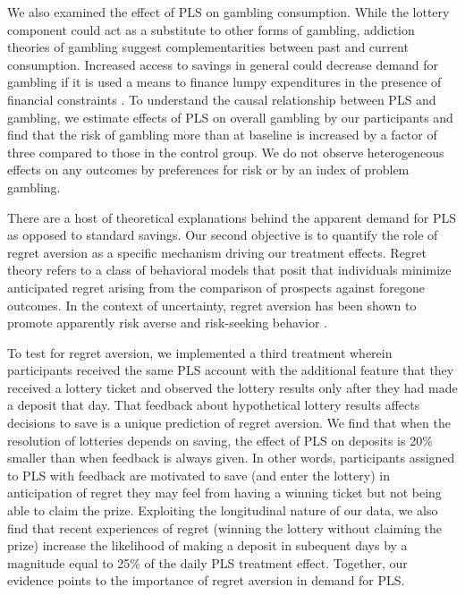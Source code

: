 \documentclass[12pt]{article}
\begin{document}
	We also examined the effect of PLS on gambling consumption. While the lottery component could act as a substitute to other forms of gambling, addiction theories of gambling \parencite{becker_theory_1988} suggest complementarities between past and current consumption. Increased access to savings in general could decrease demand for gambling if it is used a means to finance lumpy expenditures in the presence of financial constraints \parencite{herskowitz_gambling_2016}. To understand the causal relationship between PLS and gambling, we estimate effects of PLS on overall gambling by our participants and find that the risk of gambling more than at baseline is increased by a factor of three compared to those in the control group. We do not observe heterogeneous effects on any outcomes by preferences for risk or by an index of problem gambling.

	There are a host of theoretical explanations behind the apparent demand for PLS as opposed to standard savings. Our second objective is to quantify the role of regret aversion \parencite{bell_risk_1983,loomes_regret_1982} as a specific mechanism driving our treatment effects. Regret theory refers to a class of behavioral models that posit that individuals minimize anticipated regret arising from the comparison of prospects against foregone outcomes. In the context of uncertainty, regret aversion has been shown to promote apparently risk averse and risk-seeking behavior  \parencite{zeelenberg_consequences_1996}. 

	To test for regret aversion, we implemented a third treatment wherein participants received the same PLS account with the additional feature that they received a lottery ticket and observed the lottery results only after they had made a deposit that day. That feedback about hypothetical lottery results affects decisions to save is a unique prediction of regret aversion. We find that when the resolution of lotteries depends on saving, the effect of PLS on deposits is 20\% smaller than when feedback is always given. In other words, participants assigned to PLS with feedback are motivated to save (and enter the lottery) in anticipation of regret they may feel from having a winning ticket but not being able to claim the prize. Exploiting the longitudinal nature of our data, we also find that recent experiences of regret (winning the lottery without claiming the prize) increase the likelihood of making a deposit in subequent days by a magnitude equal to 25\% of the daily PLS treatment effect. Together, our evidence points to the importance of regret aversion in demand for PLS.
\end{document}
